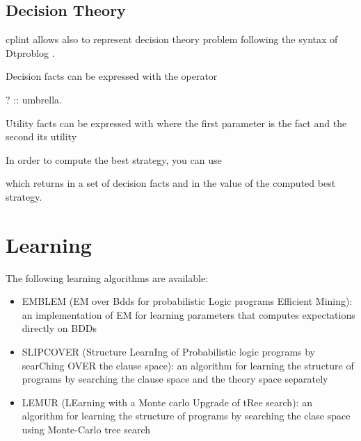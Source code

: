 \documentclass[letterpaper,10pt,english]{sphinxmanual}
\begin{document}
\section{Decision Theory}
\label{\detokenize{index:decision-theory}}
cplint allows also to represent decision theory problem following the syntax of Dtproblog .

Decision facts can be expressed with the operator 

\begin{sphinxVerbatim}[commandchars=\\\{\}]
? :: umbrella.
\end{sphinxVerbatim}

Utility facts can be expressed with  where the first parameter is the fact and the second its utility

\begin{sphinxVerbatim}[commandchars=\\\{\}]
\end{sphinxVerbatim}

In order to compute the best strategy, you can use 

\begin{sphinxVerbatim}[commandchars=\\\{\}]
\end{sphinxVerbatim}

which returns in  a set of decision facts and in  the value of the computed best strategy.


\chapter{Learning}
\label{\detokenize{index:learning}}
The following learning algorithms are available:
\begin{itemize}
\item {} 
EMBLEM (EM over Bdds for probabilistic Logic programs Efficient Mining): an implementation of EM for learning parameters that computes expectations directly on BDDs 

\item {} 
SLIPCOVER (Structure LearnIng of Probabilistic logic programs by searChing OVER the clause space): an algorithm for learning the structure of programs by searching the clause space and the theory space separately 

\item {} 
LEMUR (LEarning with a Monte carlo Upgrade of tRee search): an algorithm for learning the structure of programs by searching the clase space using Monte-Carlo tree search 

\end{itemize}
\end{document}
